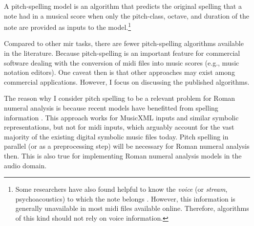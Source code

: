 

A pitch-spelling model is an algorithm that predicts the
original spelling that a note had in a musical score when
only the pitch-class, octave, and duration of the note are
provided as inputs to the model.\footnote{Some researchers
have also found helpful to know the \emph{voice} (or
\emph{stream}, psychoacoustics) to which the note belongs
\parencite{teodoru2007pitch}. However, this information is
generally unavailable in most \gls{midi} files available
online. Therefore, algorithms of this kind should not rely
on voice information.}


Compared to other \gls{mir} tasks, there are fewer
pitch-spelling algorithms available in the literature.
Because pitch-spelling is an important feature for
commercial software dealing with the conversion of
\gls{midi} files into music scores (e.g., music notation
editors). One caveat then is that other approaches may exist among commercial applications. However, I focus on discussing the published algorithms.

The reason why I consider pitch spelling to be a relevant
problem for Roman numeral analysis is because recent models
have benefitted from spelling information
\parencite{micchi2020not}. This approach works for MusicXML
inputs and similar symbolic representations, but not for
\gls{midi} inputs, which arguably account for the vast
majority of the existing digital symbolic music files today.
Pitch spelling in parallel (or as a preprocessing step) will
be necessary for Roman numeral analysis then. This is also
true for implementing Roman numeral analysis models in the
audio domain.
